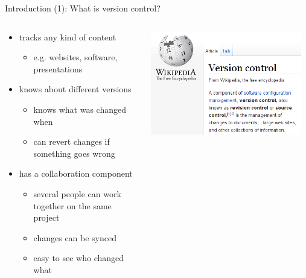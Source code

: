 \documentclass{beamer}
\newcommand{\inote}[1]{
  {
    \begin{itemize}
      \item #1
    \end{itemize}
  }
}
\begin{document}
    \begin{frame}{Introduction (1): What is version control?}
      \begin{columns}[onlytextwidth]
        \begin{column}{0.6\textwidth}
          \begin{itemize}
              \item tracks any kind of content
                \inote{e.g. websites, software, presentations}
              \item knows about different versions
              \begin{itemize}
                \item knows what was changed when
                \item can revert changes if something goes wrong
              \end{itemize}
              \item has a collaboration component
              \begin{itemize}
                \item several people can work together on the same project
                \item changes can be synced
                \item easy to see who changed what
              \end{itemize}
            \end{itemize}
        \end{column}
        \begin{column}[t]{0.4\textwidth}
          \includegraphics[width=0.95\textwidth]{imgs/vc_wikipedia}
        \end{column}
      \end{columns}
    \end{frame}
    
\end{document}
